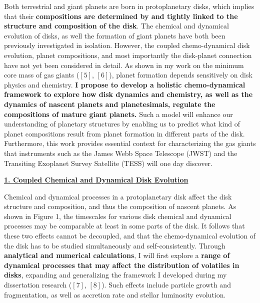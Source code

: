 \documentclass[12pt, letterpaper]{article}
\begin{document}
Both terrestrial and giant planets are born in protoplanetary disks, which implies that their \textbf{compositions are determined by and tightly linked to the structure and composition of the disk}. The chemical and dynamical evolution of disks, as well the formation of giant planets have both been previously investigated in isolation. However, the coupled chemo-dynamical disk evolution, planet compositions, and most importantly the disk-planet connection have not yet been considered in detail. As shown in my work on the minimum core mass of gas giants ($[5]$, $[6]$), planet formation depends sensitively on disk physics and chemistry. \textbf{I propose to develop a holistic chemo-dynamical framework to explore how disk dynamics and chemistry, as well as the dynamics of nascent planets and planetesimals, regulate the compositions of mature giant planets.} Such a model will enhance our understanding of planetary structures by enabling us to predict what kind of planet compositions result from planet formation in different parts of the disk. Furthermore, this work provides essential context for characterizing the gas giants that instruments such as the James Webb Space Telescope (JWST) and the Transiting Exoplanet Survey Satellite (TESS) will one day discover. %

\vspace{0.2in}

\underline{\textbf{1. Coupled Chemical and Dynamical Disk Evolution}}

Chemical and dynamical processes in a protoplanetary disk affect the disk structure and composition, and thus the composition of nascent planets. As shown in Figure 1, the timescales for various disk chemical and dynamical processes may be comparable at least in some parts of the disk. It follows that these two effects cannot be decoupled, and that the chemo-dynamical evolution of the disk has to be studied simultaneously and self-consistently. Through \textbf{analytical and numerical calculations}, I will first explore a \textbf{range of dynamical processes that may affect the distribution of volatiles in disks}, expanding and generalizing the framework I developed during my dissertation research ($[7]$, $[8]$). Such effects include particle growth and fragmentation, as well as accretion rate and stellar luminosity evolution.   
\end{document}
